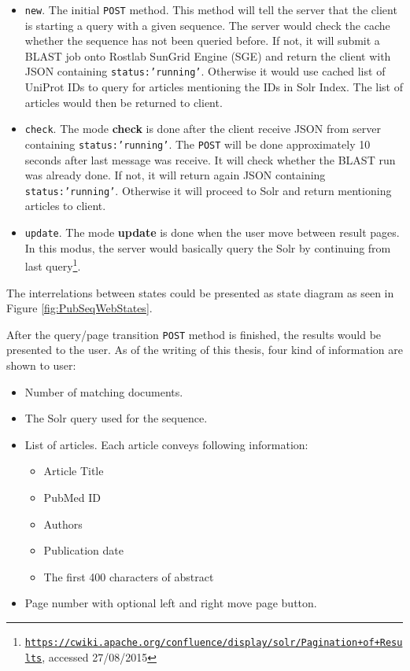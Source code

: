 \begin{itemize}
\item \texttt{new}. The initial \texttt{POST} method. This method will tell the server that the client is starting a query with a given sequence. The server would check the cache whether the sequence has not been queried before. If not, it will submit a BLAST job onto Rostlab SunGrid Engine (SGE) and return the client with JSON containing \texttt{status:'running'}. Otherwise it would use cached list of UniProt IDs to query for articles mentioning the IDs in Solr Index. The list of articles would then be returned to client. 
\item \texttt{check}. The mode \textbf{check} is done after the client receive JSON from server containing \texttt{status:'running'}. The \texttt{POST} will be done approximately 10 seconds after last message was receive. It will check whether the BLAST run was already done. If not, it will return again JSON containing \texttt{status:'running'}. Otherwise it will proceed to Solr and return mentioning articles to client.
\item \texttt{update}. The mode \textbf{update} is done when the user move between result pages. In this modus, the server would basically query the Solr by continuing from last query\footnote{\href{https://cwiki.apache.org/confluence/display/solr/Pagination+of+Results}{\texttt{https://cwiki.apache.org/confluence/display/solr/Pagination+of+Results}}, accessed 27/08/2015}.
\end{itemize}

The interrelations between states could be presented as state diagram as seen in Figure \ref{fig:PubSeqWebStates}.

After the query/page transition \texttt{POST} method is finished, the results would be presented to the user. As of the writing of this thesis, four kind of information are shown to user:

\begin{itemize}
  \item Number of matching documents.
  \item The Solr query used for the sequence.
  \item List of articles. Each article conveys following information:
   \begin{itemize}
    \item Article Title
    \item PubMed ID
    \item Authors
    \item Publication date
    \item The first 400 characters of abstract
  \end{itemize}
  \item Page number with optional left and right move page button.
\end{itemize}

